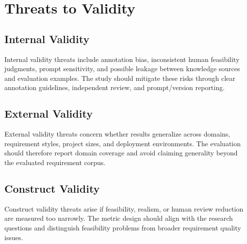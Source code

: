 \section{Threats to Validity}
\label{threats}

\subsection{Internal Validity}
\label{threats:internal}

Internal validity threats include annotation bias, inconsistent human feasibility judgments, prompt sensitivity, and possible leakage between knowledge sources and evaluation examples.
The study should mitigate these risks through clear annotation guidelines, independent review, and prompt/version reporting.

\subsection{External Validity}
\label{threats:external}

External validity threats concern whether results generalize across domains, requirement styles, project sizes, and deployment environments.
The evaluation should therefore report domain coverage and avoid claiming generality beyond the evaluated requirement corpus.

\subsection{Construct Validity}
\label{threats:construct}

Construct validity threats arise if feasibility, realism, or human review reduction are measured too narrowly.
The metric design should align with the research questions and distinguish feasibility problems from broader requirement quality issues.
